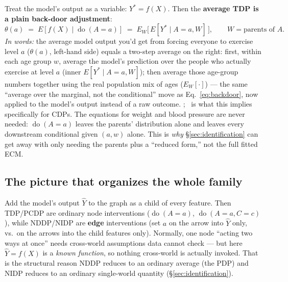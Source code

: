 Treat the model's output as a variable: $Y^* = f(X)$. Then the
\textbf{average TDP is a plain back-door adjustment}:
\begin{equation}
  \theta(a) \;=\; E[f(X) \mid \operatorname{do}(A=a)]
  \;=\; E_W\big[\, E[Y^* \mid A=a, W] \,\big], \qquad W = \text{parents of } A.
  \label{eq:tdp-backdoor}
\end{equation}
\emph{In words:} the average model output you'd get from forcing everyone
to exercise level $a$ ($\theta(a)$, left-hand side) equals a two-step
average on the right: first, within each age group $w$, average the
model's prediction over the people who actually exercise at level $a$
(inner $E[Y^*\mid A=a,W]$); then average those age-group numbers together
using the real population mix of ages ($E_W[\cdot]$) --- the same
``average over the marginal, not the conditional'' move as
Eq.~\ref{eq:backdoor}, now applied to the model's output instead of a raw
outcome.
; \newtag~is
what this implies specifically for CDPs. The equations for weight and blood
pressure are never needed: $\operatorname{do}(A=a)$ leaves the parents'
distribution alone and leaves every downstream conditional given $(a,w)$
alone. This is \emph{why} \S\ref{sec:identification} can get away with only
needing the parents plus a ``reduced form,'' not the full fitted ECM.

\subsection{The picture that organizes the whole family}

 Add the model's output $\hat Y$
to the graph as a child of every feature. Then TDP/PCDP are ordinary node
interventions ($\operatorname{do}(A=a)$, $\operatorname{do}(A=a,C=c)$), while
NDDP/NIDP are \textbf{edge} interventions (set $a$ on the arrow into $\hat
Y$ only, vs.\ on the arrows into the child features only). Normally, one
node ``acting two ways at once'' needs cross-world assumptions data cannot
check --- but here $\hat Y = f(X)$ is a \emph{known function}, so nothing
cross-world is actually invoked. That is the structural reason NDDP reduces
to an ordinary average (the PDP) and NIDP reduces to an ordinary
single-world quantity (\S\ref{sec:identification}).

